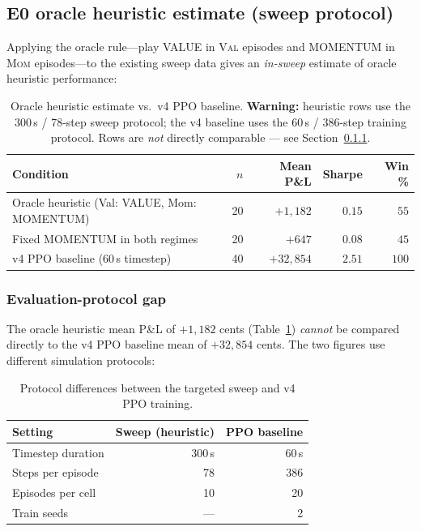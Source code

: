\documentclass[11pt]{article}
\begin{document}
\subsection{E0 oracle heuristic estimate (sweep protocol)}
\label{sec:e0estimate}

Applying the oracle rule---play VALUE in \textsc{Val} episodes and MOMENTUM
in \textsc{Mom} episodes---to the existing sweep data gives an \emph{in-sweep}
estimate of oracle heuristic performance:

\begin{table}[H]
\centering
\begin{tabular}{lrrrr}
\toprule
\textbf{Condition} & \textbf{$n$} & \textbf{Mean P\&L} & \textbf{Sharpe} & \textbf{Win \%} \\
\midrule
Oracle heuristic (Val: VALUE, Mom: MOMENTUM) & 20 & $+1{,}182$ & $0.15$ & $55$ \\
Fixed MOMENTUM in both regimes              & 20 & $+647$     & $0.08$ & $45$ \\
\midrule
v4 PPO baseline (60\,s timestep)            & 40 & $+32{,}854$ & $2.51$ & $100$ \\
\bottomrule
\end{tabular}
\caption{Oracle heuristic estimate vs.\ v4 PPO baseline.
         \textbf{Warning:} heuristic rows use the 300\,s / 78-step sweep
         protocol; the v4 baseline uses the 60\,s / 386-step training
         protocol. Rows are \emph{not} directly comparable --- see
         Section~\ref{sec:protocolgap}.}
\label{tab:e0estimate}
\end{table}

\subsubsection{Evaluation-protocol gap}
\label{sec:protocolgap}

The oracle heuristic mean P\&L of $+1{,}182$ cents (Table~\ref{tab:e0estimate})
\emph{cannot} be compared directly to the v4 PPO baseline mean of $+32{,}854$
cents.
The two figures use different simulation protocols:

\begin{table}[H]
\centering
\begin{tabular}{lrr}
\toprule
\textbf{Setting} & \textbf{Sweep (heuristic)} & \textbf{PPO baseline} \\
\midrule
Timestep duration  & 300\,s  & 60\,s \\
Steps per episode  & 78      & 386   \\
Episodes per cell  & 10      & 20 \\
Train seeds        & ---     & 2 \\
\bottomrule
\end{tabular}
\caption{Protocol differences between the targeted sweep and v4 PPO training.}
\label{tab:protocolgap}
\end{table}
\end{document}
